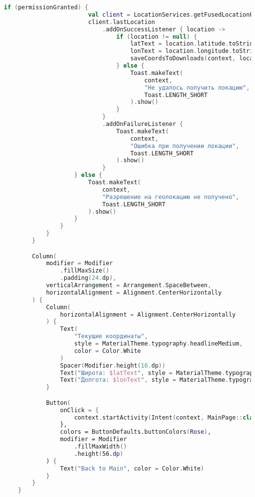 \begin{lstlisting}[language=Kotlin, caption=MapPage.kt]
                    if (permissionGranted) {
                        val client = LocationServices.getFusedLocationProviderClient(context)
                        client.lastLocation
                            .addOnSuccessListener { location ->
                                if (location != null) {
                                    latText = location.latitude.toString()
                                    lonText = location.longitude.toString()
                                    saveCoordsToDownloads(context, location.latitude, location.longitude)
                                } else {
                                    Toast.makeText(
                                        context,
                                        "Не удалось получить локацию",
                                        Toast.LENGTH_SHORT
                                    ).show()
                                }
                            }
                            .addOnFailureListener {
                                Toast.makeText(
                                    context,
                                    "Ошибка при получении локации",
                                    Toast.LENGTH_SHORT
                                ).show()
                            }
                    } else {
                        Toast.makeText(
                            context,
                            "Разрешение на геолокацию не получено",
                            Toast.LENGTH_SHORT
                        ).show()
                    }
                }
            }
        }

        Column(
            modifier = Modifier
                .fillMaxSize()
                .padding(24.dp),
            verticalArrangement = Arrangement.SpaceBetween,
            horizontalAlignment = Alignment.CenterHorizontally
        ) {
            Column(
                horizontalAlignment = Alignment.CenterHorizontally
            ) {
                Text(
                    "Текущие координаты",
                    style = MaterialTheme.typography.headlineMedium,
                    color = Color.White
                )
                Spacer(Modifier.height(16.dp))
                Text("Широта: $latText", style = MaterialTheme.typography.bodyLarge, color = Color.White)
                Text("Долгота: $lonText", style = MaterialTheme.typography.bodyLarge, color = Color.White)
            }

            Button(
                onClick = {
                    context.startActivity(Intent(context, MainPage::class.java))
                },
                colors = ButtonDefaults.buttonColors(Rose),
                modifier = Modifier
                    .fillMaxWidth()
                    .height(56.dp)
            ) {
                Text("Back to Main", color = Color.White)
            }
        }
    }


\end{lstlisting}
